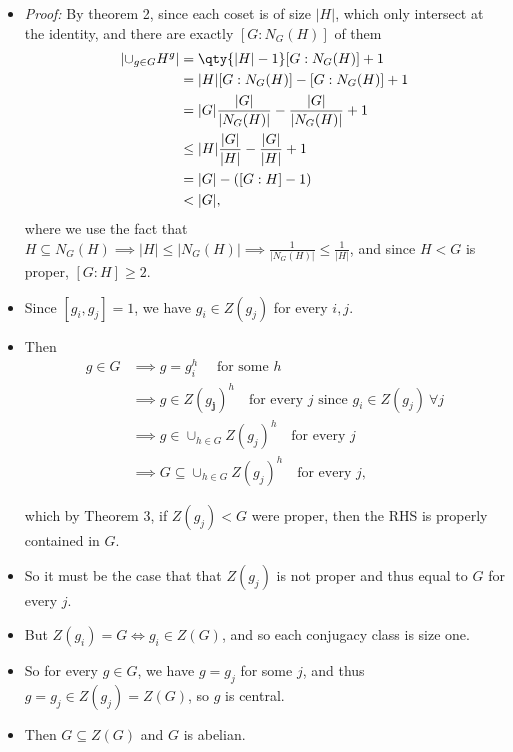 \begin{solution}
\begin{itemize}
\item
  \emph{Proof:} By theorem 2, since each coset is of size
  \({\left\lvert {H} \right\rvert}\), which only intersect at the
  identity, and there are exactly \([G: N_G(H)]\) of them
  \begin{align*}
  {\left\lvert {\cup_{g\in G} H^g} \right\rvert} 
  &= \qty{ {\left\lvert {H} \right\rvert} - 1} [G: N_G(H)] + 1\\
  &= {\left\lvert {H} \right\rvert} [G: N_G(H)]  - [G:N_G(H)] + 1\\
  &= {\left\lvert {G} \right\rvert} \frac{{\left\lvert {G} \right\rvert}}{{\left\lvert {N_G(H)} \right\rvert}} - \frac{{\left\lvert {G} \right\rvert}}{{\left\lvert {N_G(H)} \right\rvert}} + 1 \\
  &\leq {\left\lvert {H} \right\rvert} \frac{{\left\lvert {G} \right\rvert}}{{\left\lvert {H} \right\rvert}} - \frac{{\left\lvert {G} \right\rvert}}{{\left\lvert {H} \right\rvert}} + 1 \\
  &= {\left\lvert {G} \right\rvert} - ([G: H] - 1) \\
  &< {\left\lvert {G} \right\rvert} 
  ,\end{align*}
  where we use the fact that
  \(H \subseteq N_G(H) \implies {\left\lvert {H} \right\rvert} \leq {\left\lvert {N_G(H)} \right\rvert} \implies \frac{1}{{\left\lvert {N_G(H)} \right\rvert}} \leq \frac{1}{{\left\lvert {H} \right\rvert}}\),
  and since \(H < G\) is proper, \([G:H] \geq 2\).
\item
  Since \([g_i, g_j] = 1\), we have \(g_i \in Z(g_j)\) for every
  \(i, j\).
\item
  Then
  \begin{align*}
  g\in G 
  &\implies g = g_i^h \quad \text{ for some } h \\
  &\implies g \in Z(g_\mathbf{j})^h \quad\text{for every } j \text{ since }g_i \in Z(g_j) ~\forall j \\
  &\implies g \in \cup_{h\in G} Z(g_j)^h \quad\text{for every } j\\
  &\implies G \subseteq \cup_{h\in G} Z(g_j)^h \quad\text{for every } j
  ,\end{align*}

  which by Theorem 3, if \(Z(g_j) < G\) were proper, then the RHS is
  properly contained in \(G\).
\item
  So it must be the case that that \(Z(g_j)\) is not proper and thus
  equal to \(G\) for every \(j\).
\item
  But \(Z(g_i) = G \iff g_i \in Z(G)\), and so each conjugacy class is
  size one.
\item
  So for every \(g\in G\), we have \(g = g_j\) for some \(j\), and thus
  \(g = g_j \in Z(g_j) = Z(G)\), so \(g\) is central.
\item
  Then \(G\subseteq Z(G)\) and \(G\) is abelian.
\end{itemize}

\end{solution}

